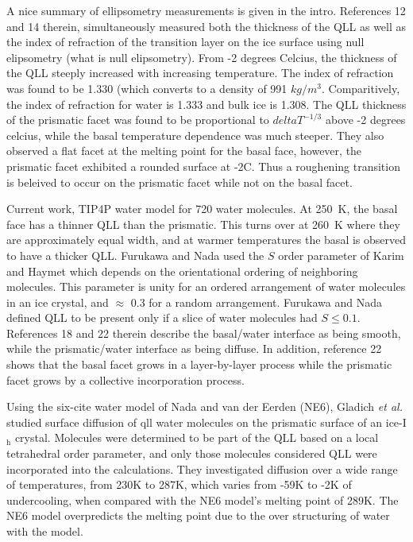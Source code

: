 A nice summary of ellipsometry measurements is given in the
intro. References 12 and 14 therein, simultaneously measured both the
thickness of the QLL as well as the index of refraction of the
transition layer on the ice surface using null elipsometry (what is
null elipsometry). From -2 degrees Celcius, the thickness of the QLL
steeply increased with increasing temperature. The index of refraction
was found to be 1.330 (which converts to a density of 991
$kg/m^{3}$. Comparitively, the index of refraction for water is 1.333
and bulk ice is 1.308. The QLL thickness of the prismatic facet was
found to be proportional to $delta T ^{-1/3}$ above -2 degrees
celcius, while the basal temperature dependence was much steeper. They
also observed a flat facet at the melting point for the basal face,
however, the prismatic facet exhibited a rounded surface at -2C. Thus
a roughening transition is beleived to occur on the prismatic facet
while not on the basal facet.\cite{Furukawa1997} 

Current work, TIP4P water model for 720 water molecules. At 250~K, the
basal face has a thinner QLL than the prismatic. This turns over at
260~K where they are approximately equal width, and at warmer
temperatures the basal is observed to have a thicker QLL. Furukawa and
Nada used the $S$ order parameter of Karim and Haymet which depends on
the orientational ordering of neighboring molecules.\cite{Karim1988}
This parameter is unity for an ordered arrangement of water molecules
in an ice crystal, and $\approx$ 0.3 for a random
arrangement. Furukawa and Nada defined QLL to be present only if a
slice of water molecules had $S \le 0.1$. References 18 and 22 therein
describe the basal/water interface as being smooth, while the
prismatic/water interface as being diffuse. In addition, reference 22
shows that the basal facet grows in a layer-by-layer process while the
prismatic facet grows by a collective incorporation process. 

Using the six-cite water model of Nada and van der Eerden (NE6),
Gladich \textit{et al.} studied surface diffusion of qll water
molecules on the prismatic surface of an ice-I$_\mathrm{h}$
crystal.\cite{Gladich2011} Molecules were determined to be part of the
QLL based on a local tetrahedral order parameter, and only those
molecules considered QLL were incorporated into the calculations. They
investigated diffusion over a wide range of temperatures, from 230K to
287K, which varies from -59K to -2K of undercooling, when compared
with the NE6 model's melting point of 289K. The NE6 model overpredicts
the melting point due to the over structuring of water with the model.


